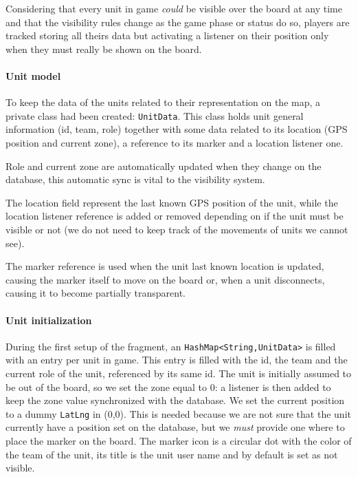 			Considering that every unit in game \emph{could} be visible over the board at any time and that the visibility rules change as the game phase or status do so, players are tracked storing all theirs data but activating a listener on their position only when they must really be shown on the board.
			
				\paragraph{Unit model}
					
				To keep the data of the units related to their representation on the map, a private class had been created: \lstinline|UnitData|.
				This class holds unit general information (id, team, role) together with some data related to its location (GPS position and current zone), a reference to its marker and a location listener one.
				
				Role and current zone are automatically updated when they change on the database, this automatic sync is vital to the visibility system.
				
				The location field represent the last known GPS position of the unit, while the location listener reference is added or removed depending on if the unit must be visible or not (we do not need to keep track of the movements of units we cannot see).
				
				The marker reference is used when the unit last known location is updated, causing the marker itself to move on the board or, when a unit disconnects, causing it to become partially transparent.
			
				\paragraph{Unit initialization}
				
				During the first setup of the fragment, an \lstinline|HashMap<String,UnitData>| is filled with an entry per unit in game.
				This entry is filled with the id, the team and the current role of the unit, referenced by its same id.
				The unit is initially assumed to be out of the board, so we set the zone equal to 0: a listener is then added to keep the zone value synchronized with the database.
				We set the current position to a dummy \lstinline|LatLng| in (0,0). This is needed because we are not sure that the unit currently have a position set on the database, but we \emph{must} provide one where to place the marker on the board.
				The marker icon is a circular dot with the color of the team of the unit, its title is the unit user name and by default is set as not visible.
				

